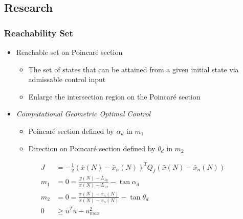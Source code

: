 \documentclass[11pt,professionalfonts]{beamer}
\begin{document}
\subsection{Research}
\begin{frame} %
\frametitle{Reachability Set}
  \begin{itemize}
  \item Reachable set on Poincar\'e section
  		\begin{itemize}
  			\item The set of states that can be attained from a given initial state via admissable control input
  			\item Enlarge the intersection region on the Poincar\'e section
  		\end{itemize}
  \item \emph{Computational Geometric Optimal Control}
	\begin{itemize}
  		\item Poincar\'e section defined by \( \alpha_d \) in \( m_1\)
		\item Direction on Poincar\'e section defined by \( \theta_d \) in \( m_2 \)
	\end{itemize}
 \end{itemize}
  \begin{align*}
	J &= -\frac{1}{2} \left( \bar{x}(N) - \bar{x}_{n}(N)\right)^T Q_f\left( \bar{x}(N) - \bar{x}_{n}(N)\right)\\
	m_1 &= 0 = \frac{y(N) - L_{1y}}{x(N) - L_{1x}} - \tan{\alpha_d} \\ 
    m_2&= 0 = \frac{\dot{x}(N) - \dot{x_n}(N) }{x(N) -x_n(N) } - \tan{\theta_d} \\
	 0 &\geq\bar{u}^T \bar{u} - u_{max}^2 
	\end{align*}

\end{frame}   %
\end{document}
